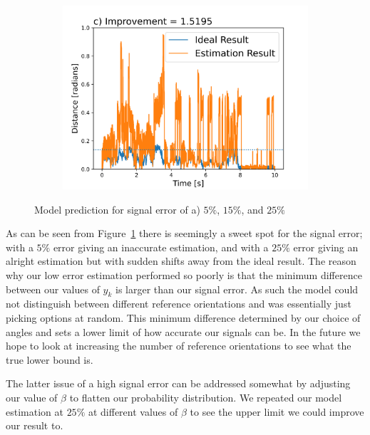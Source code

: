 \documentclass[final, 3p]{elsarticle}
\begin{document}
\begin{figure}[h]
\begin{subfigure}{0.32\textwidth}
		\includegraphics[width=\textwidth]{./Images/epsilon_25.png}
	\end{subfigure}
	\caption{Model prediction for signal error of a) $5\%$, $15\%$, and $25\%$}
	\label{fig:epsilon}
\end{figure}

As can be seen from Figure~\ref{fig:epsilon} there is seemingly a sweet spot for the signal error; with a $5\%$ error giving an inaccurate estimation, and with a $25\%$ error giving an alright estimation but with sudden shifts away from the ideal result. The reason why our low error estimation performed so poorly is that the minimum difference between our values of $y_k$ is larger than our signal error. As such the model could not distinguish between different reference orientations and was essentially just picking options at random. This minimum difference determined by our choice of angles and sets a lower limit of how accurate our signals can be.  In the future we hope to look at increasing the number of reference orientations to see what the true lower bound is.  

The latter issue of a high signal error can be addressed somewhat by adjusting our value of $\beta$ to flatten our probability distribution. We repeated our model estimation at $25\%$ at different values of $\beta$ to see the upper limit we could improve our result to.    
\end{document}
